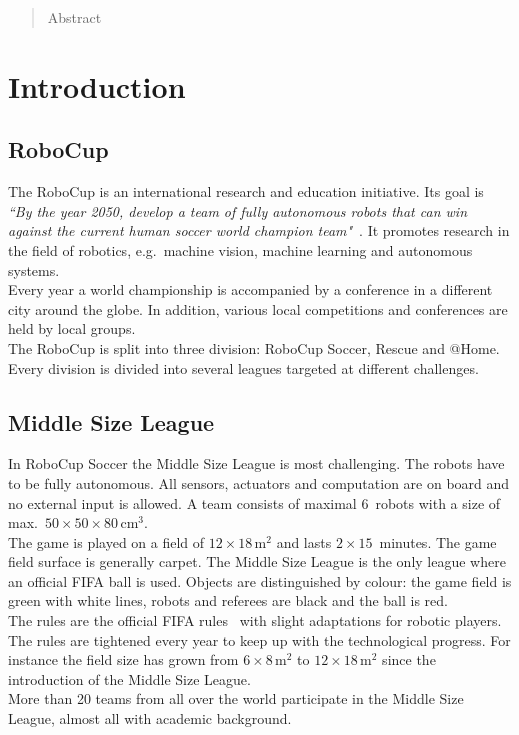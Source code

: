 \documentclass[12pt,a4paper]{article}
\newcommand{\MSL}{Middle Size League\xspace}
\begin{document}


\tableofcontents
\clearpage
\pagestyle{plain}


\begin{abstract}
Abstract

\end{abstract}

\clearpage

\section{Introduction}


\subsection{RoboCup}

The RoboCup is an international research and education initiative. 
Its goal is \emph{``By the year 2050, develop a team of fully autonomous robots that can win against the current human soccer world champion team"}~\cite{robocup.org}.
It promotes research in the field of robotics, e.g.\ machine vision, machine learning and autonomous systems.\\
Every year a world championship is accompanied by a conference in a different city around the globe.
In addition, various local competitions and conferences are held by local groups.\\
The RoboCup is split into three division: RoboCup Soccer, Rescue and @Home.
Every division is divided into several leagues targeted at different challenges.


\subsection{\MSL}

In RoboCup Soccer the \MSL is most challenging.
The robots have to be fully autonomous.
All sensors, actuators and computation are on board and no external input is allowed.
A team consists of maximal 6~robots with a size of max.\ $50\times50\times80$\,cm$^3$.\\
The game is played on a field of $12\times18$\,m$^2$ and lasts $2\times15$~minutes.
The game field surface is generally carpet.
The \MSL is the only league where an official FIFA ball is used.
Objects are distinguished by colour: the game field is green with white lines, robots and referees are black and the ball is red.\\
The rules are the official FIFA rules~\cite{msl-rules} with slight adaptations for robotic players.
The rules are tightened every year to keep up with the technological progress. 
For instance the field size has grown from $6\times8$\,m$^2$ to $12\times18$\,m$^2$ since the introduction of the \MSL.\\
More than 20 teams from all over the world participate in the \MSL, almost all with academic background.
\end{document}
